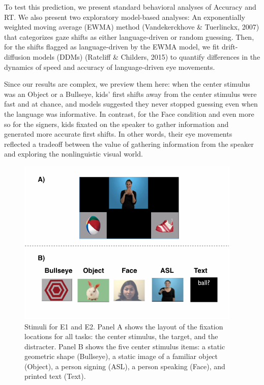 \documentclass[10pt, letterpaper]{article}
\newenvironment{CodeChunk}{}{}
\begin{document}
To test this prediction, we present standard behavioral analyses of
Accuracy and RT. We also present two exploratory model-based analyses:
An exponentially weighted moving average (EWMA) method (Vandekerckhove
\& Tuerlinckx, 2007) that categorizes gaze shifts as either
language-driven or random guessing. Then, for the shifts flagged as
language-driven by the EWMA model, we fit drift-diffusion models (DDMs)
(Ratcliff \& Childers, 2015) to quantify differences in the dynamics of
speed and accuracy of language-driven eye movements.

Since our results are complex, we preview them here: when the center
stimulus was an Object or a Bullseye, kids' first shifts away from the
center stimulus were fast and at chance, and models suggested they never
stopped guessing even when the language was informative. In contrast,
for the Face condition and even more so for the signers, kids fixated on
the speaker to gather information and generated more accurate first
shifts. In other words, their eye movements reflected a tradeoff between
the value of gathering information from the speaker and exploring the
nonlinguistic visual world.

\begin{CodeChunk}
\begin{figure}[t]

{\centering \includegraphics{figs/e1_stimuli-1} 

}

\caption[Stimuli for E1 and E2]{Stimuli for E1 and E2. Panel A shows the layout of the fixation locations for all tasks: the center stimulus, the target, and the distracter. Panel B shows the five center stimulus items: a static geometric shape (Bullseye), a static image of a familiar object (Object), a person signing (ASL), a person speaking (Face), and printed text (Text).}\label{fig:e1_stimuli}
\end{figure}
\end{CodeChunk}
\end{document}

